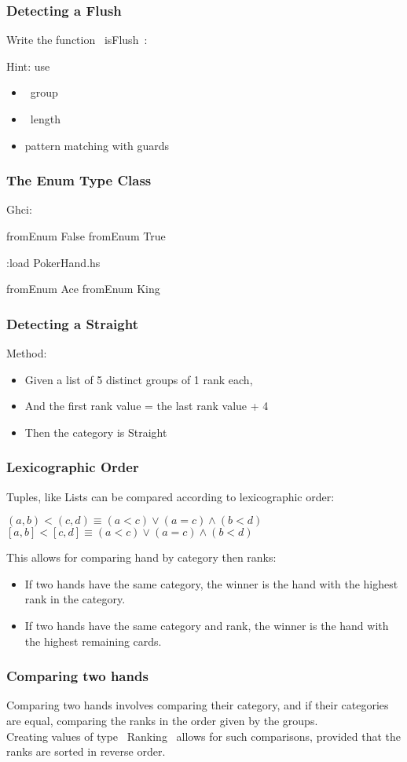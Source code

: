 \documentclass[11pt,xcolor={dvipsnames}]{beamer}
\newcommand{\tc}{\textcolor}
\newcommand{\key}[1]{\tc{orange}{#1}}
\newcommand{\rk}{\enskip{\key{$\hookleftarrow$}}}
\newcommand{\vs}{\vspace{1em}}
\newcommand{\lstH}[1]{}
\newcommand{\lstT}[1]{}
\begin{document}
\begin{frame}[fragile]
\frametitle{Detecting a Flush}
Write the function ~isFlush~:
\lstT{043}
Hint: use
\begin{itemize}
\item  ~group~
\item  ~length~
\item  pattern matching with guards
\end{itemize}
\end{frame}
\begin{frame}[fragile]
\frametitle{The Enum Type Class}
Ghci:
\begin{term}
fromEnum False\rk
fromEnum True\rk

:load PokerHand.hs\rk

fromEnum Ace\rk
fromEnum King\rk
\end{term}
\end{frame}
\begin{frame}[fragile]
\frametitle{Detecting a Straight}
Method:
\begin{itemize}
\item  Given a list of 5 distinct groups of 1 rank each, 
\item  And   the first rank value = the last rank value + 4
\item  Then  the category is Straight
\end{itemize}
\lstH{045}
\end{frame}
\begin{frame}[fragile]
\frametitle{Lexicographic Order}
Tuples, like Lists can be compared according to lexicographic order:
\begin{center}
$(a,b) < (c,d) \equiv (a<c) \vee (a=c) \wedge (b<d)$\\
\vs
$[a,b] < [c,d] \equiv (a<c) \vee (a=c) \wedge (b<d)$
\end{center}
This allows for comparing hand by category then ranks:
\begin{itemize}
\item  If two hands have the same category, the winner is the hand with the highest rank in the category.
\item  If two hands have the same category and rank, the winner is the hand with the highest remaining cards. 
\end{itemize}
\end{frame}
\begin{frame}[fragile]
\frametitle{Comparing two hands}
Comparing two hands involves comparing their category, and if their categories are equal, comparing the ranks in the order given by the groups.\\
\vs
Creating values of type ~Ranking~ allows for such comparisons, provided that the ranks are sorted in reverse order.
\lstT{047}
\end{frame}
\end{document}
